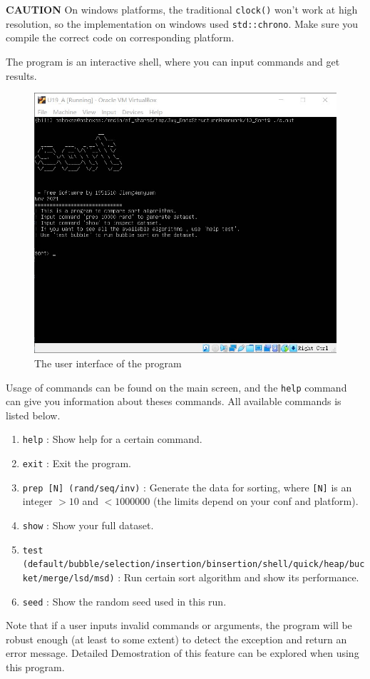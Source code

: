 \documentclass[cn,black,12pt,normal]{elegantnote}
\begin{document}
\textbf{CAUTION} On windows platforms, the traditional \lstinline{clock()} won't work at high resolution, so the implementation on windows used \lstinline{std::chrono}. Make sure you compile the correct code on corresponding platform.

The program is an interactive shell, where you can input commands and get results.

\begin{figure}[H]
    \centering
    \includegraphics[width=0.7\linewidth]{image/sort_01.jpg}
    \caption{The user interface of the program}
\end{figure}

Usage of commands can be found on the main screen, and the \lstinline{help} command can give you information about theses commands.  All available commands is listed below.

\begin{enumerate}
    \item \lstinline{help} : Show help for a certain command.
    \item \lstinline{exit} : Exit the program.
    \item \lstinline{prep [N] (rand/seq/inv)} : Generate the data for sorting, where \lstinline{[N]} is an integer $> 10$ and $< 1000000$ (the limits depend on your conf and platform).
    \item \lstinline{show} : Show your full dataset.
    \item \lstinline{test (default/bubble/selection/insertion/binsertion/shell/quick/heap/bucket/merge/lsd/msd)} : Run certain sort algorithm and show its performance.
    \item \lstinline{seed} : Show the random seed used in this run.
\end{enumerate}
Note that if a user inputs invalid commands or arguments, the program will be robust enough (at least to some extent) to detect the exception and return an error message. Detailed Demostration of this feature can be explored when using this program.
\end{document}
